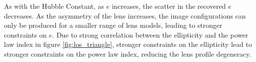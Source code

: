 As with the Hubble Constant, as $e$ increases, the scatter in the recovered $e$ decreases. As the asymmetry of the lens increases, the image configurations can only be produced for a smaller range of lens models, leading to stronger constraints on $e$. Due to strong correlation between the ellipticity and the power law index in figure \ref{fig:los_triangle}, stronger constraints on the ellipticity lead to stronger constraints on the power law index, reducing the lens profile degeneracy. 